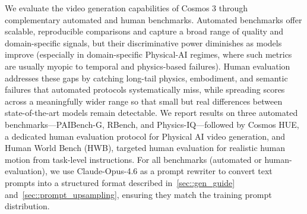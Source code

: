 \documentclass{llmxive}
\begin{document}
We evaluate the video generation capabilities of Cosmos 3 through complementary automated and human benchmarks. Automated benchmarks offer scalable, reproducible comparisons and capture a broad range of quality and domain-specific signals, but their discriminative power diminishes as models improve (especially in domain-specific Physical-AI regimes, where such metrics are usually myopic to temporal and physics-based failures). Human evaluation addresses these gaps by catching long-tail physics, embodiment, and semantic failures that automated protocols systematically miss, while spreading scores across a meaningfully wider range so that small but real differences between state-of-the-art models remain detectable. We report results on three automated benchmarks---PAIBench-G, RBench, and Physics-IQ---followed by Cosmos HUE, a dedicated human evaluation protocol for Physical AI video generation, and Human World Bench (HWB), targeted human evaluation for realistic human motion from task-level instructions. For all benchmarks (automated or human-evaluation), we use Claude-Opus-4.6 as a prompt rewriter to convert text prompts into a structured format described in~\cref{sec::gen_guide} and~\cref{sec::prompt_upsampling}, ensuring they match the training prompt distribution.

\label{subsubsec::paibench_g}
\end{document}
